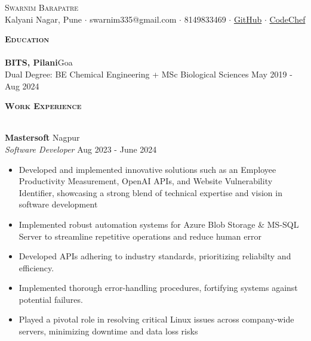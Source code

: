 \documentclass[a4paper]{article}
\newcommand{\lineunder} {
\vspace*{-8pt} \\
\hspace*{-18pt} \hrulefill \\
}
\newcommand{\header}[1]{%
{\hspace*{-18pt}\vspace*{6pt} \textsc{\textbf{\Large{#1}}}}%
\vspace*{-6pt} \lineunder
}
\begin{document}
\vspace*{-40pt}

\vspace*{-10pt}
\begin{center}
{\Huge \scshape {Swarnim Barapatre}}\\
Kalyani Nagar, Pune $\cdot$ swarnim335@gmail.com $\cdot$ 8149833469 $\cdot$ \href{https://github.com/swarnimcodes/}{GitHub} $\cdot$ \href{https://www.codechef.com/users/b_swarniim}{CodeChef} \\
\end{center}

\header{Education}

{\textbf{BITS, Pilani}}\hfill Goa\\
Dual Degree: BE Chemical Engineering + MSc Biological Sciences \hfill May 2019 - Aug 2024\\

\vspace{2mm}

\header{Work Experience}
\vspace{1mm}

\textbf{Mastersoft} \hfill Nagpur\\
\textit{Software Developer} \hfill Aug 2023 - June 2024\\
\vspace{-1mm}
\begin{itemize} \itemsep 1pt
\item Developed and implemented innovative solutions such as an Employee Productivity Measurement, OpenAI APIs, and 
Website Vulnerability Identifier, showcasing a strong blend of technical expertise and vision in software development
\item Implemented robust automation systems for Azure Blob Storage \& MS-SQL Server to streamline repetitive operations and reduce human error
\item Developed APIs adhering to industry standards, prioritizing reliabilty and efficiency. 
\item Implemented thorough error-handling procedures, fortifying systems against potential failures.
\item Played a pivotal role in resolving critical Linux issues across company-wide servers, 
minimizing downtime and data loss risks
\end{itemize}
\end{document}
